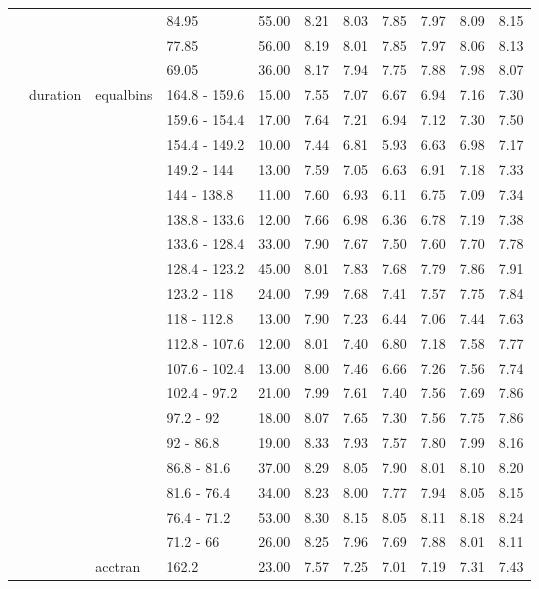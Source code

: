 \begin{longtable}{llllrrrrrrr}
   &  &  & 84.95 & 55.00 & 8.21 & 8.03 & 7.85 & 7.97 & 8.09 & 8.15 \\ 
   &  &  & 77.85 & 56.00 & 8.19 & 8.01 & 7.85 & 7.97 & 8.06 & 8.13 \\ 
   &  &  & 69.05 & 36.00 & 8.17 & 7.94 & 7.75 & 7.88 & 7.98 & 8.07 \\ 
   & duration & equalbins & 164.8 - 159.6 & 15.00 & 7.55 & 7.07 & 6.67 & 6.94 & 7.16 & 7.30 \\ 
   &  &  & 159.6 - 154.4 & 17.00 & 7.64 & 7.21 & 6.94 & 7.12 & 7.30 & 7.50 \\ 
   &  &  & 154.4 - 149.2 & 10.00 & 7.44 & 6.81 & 5.93 & 6.63 & 6.98 & 7.17 \\ 
   &  &  & 149.2 - 144 & 13.00 & 7.59 & 7.05 & 6.63 & 6.91 & 7.18 & 7.33 \\ 
   &  &  & 144 - 138.8 & 11.00 & 7.60 & 6.93 & 6.11 & 6.75 & 7.09 & 7.34 \\ 
   &  &  & 138.8 - 133.6 & 12.00 & 7.66 & 6.98 & 6.36 & 6.78 & 7.19 & 7.38 \\ 
   &  &  & 133.6 - 128.4 & 33.00 & 7.90 & 7.67 & 7.50 & 7.60 & 7.70 & 7.78 \\ 
   &  &  & 128.4 - 123.2 & 45.00 & 8.01 & 7.83 & 7.68 & 7.79 & 7.86 & 7.91 \\ 
   &  &  & 123.2 - 118 & 24.00 & 7.99 & 7.68 & 7.41 & 7.57 & 7.75 & 7.84 \\ 
   &  &  & 118 - 112.8 & 13.00 & 7.90 & 7.23 & 6.44 & 7.06 & 7.44 & 7.63 \\ 
   &  &  & 112.8 - 107.6 & 12.00 & 8.01 & 7.40 & 6.80 & 7.18 & 7.58 & 7.77 \\ 
   &  &  & 107.6 - 102.4 & 13.00 & 8.00 & 7.46 & 6.66 & 7.26 & 7.56 & 7.74 \\ 
   &  &  & 102.4 - 97.2 & 21.00 & 7.99 & 7.61 & 7.40 & 7.56 & 7.69 & 7.86 \\ 
   &  &  & 97.2 - 92 & 18.00 & 8.07 & 7.65 & 7.30 & 7.56 & 7.75 & 7.86 \\ 
   &  &  & 92 - 86.8 & 19.00 & 8.33 & 7.93 & 7.57 & 7.80 & 7.99 & 8.16 \\ 
   &  &  & 86.8 - 81.6 & 37.00 & 8.29 & 8.05 & 7.90 & 8.01 & 8.10 & 8.20 \\ 
   &  &  & 81.6 - 76.4 & 34.00 & 8.23 & 8.00 & 7.77 & 7.94 & 8.05 & 8.15 \\ 
   &  &  & 76.4 - 71.2 & 53.00 & 8.30 & 8.15 & 8.05 & 8.11 & 8.18 & 8.24 \\ 
   &  &  & 71.2 - 66 & 26.00 & 8.25 & 7.96 & 7.69 & 7.88 & 8.01 & 8.11 \\ 
   &  & acctran & 162.2 & 23.00 & 7.57 & 7.25 & 7.01 & 7.19 & 7.31 & 7.43 \\ 

\end{longtable}
